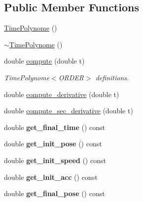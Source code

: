 \subsection*{Public Member Functions}
\begin{DoxyCompactItemize}
\item 
\hyperlink{classblmc__robots_1_1TimePolynome_a0855aaf796c9d67302a5f2225355d745}{Time\+Polynome} ()
\item 
\hyperlink{classblmc__robots_1_1TimePolynome_add49c99d57206a93c9217f374f51700a}{$\sim$\+Time\+Polynome} ()
\item 
double \hyperlink{classblmc__robots_1_1TimePolynome_a644871336a78055c4e27e9b52e75ad8c}{compute} (double t)
\begin{DoxyCompactList}\small\item\em Time\+Polynome$<$\+O\+R\+D\+E\+R$>$ definitions. \end{DoxyCompactList}\item 
double \hyperlink{classblmc__robots_1_1TimePolynome_a089cd5e46da974828cfb1b042119c163}{compute\+\_\+derivative} (double t)
\item 
double \hyperlink{classblmc__robots_1_1TimePolynome_a3402f5a2e56b7ef46d93342f8c208bd1}{compute\+\_\+sec\+\_\+derivative} (double t)
\item 
\mbox{\label{classblmc__robots_1_1TimePolynome_a8c6c6e522a9f4295c5d062afeb6f92a7}} 
double {\bfseries get\+\_\+final\+\_\+time} () const
\item 
\mbox{\label{classblmc__robots_1_1TimePolynome_a5700fc8407810b0be3a83149ead2516f}} 
double {\bfseries get\+\_\+init\+\_\+pose} () const
\item 
\mbox{\label{classblmc__robots_1_1TimePolynome_acd83b243253bfb3eaa389b7162f04907}} 
double {\bfseries get\+\_\+init\+\_\+speed} () const
\item 
\mbox{\label{classblmc__robots_1_1TimePolynome_aa88b45a138ac430a33ecd44fda40a94f}} 
double {\bfseries get\+\_\+init\+\_\+acc} () const
\item 
\mbox{\label{classblmc__robots_1_1TimePolynome_a05fa06c51b2ad269f5773b0242f2fed7}} 
double {\bfseries get\+\_\+final\+\_\+pose} () const

\end{DoxyCompactItemize}
